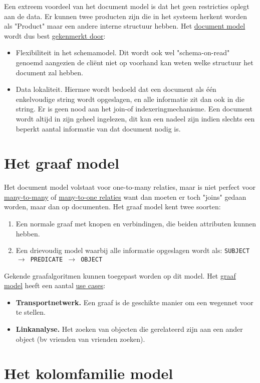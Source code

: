 \documentclass{report}
\begin{document}
	Een extreem voordeel van het document model is dat het geen restricties oplegt aan de data. Er kunnen twee producten zijn die in het systeem herkent worden als "Product" maar een andere interne structuur hebben. Het \underline{document model} wordt dus best \underline{gekenmerkt door}:
	\begin{itemize}
		\item Flexibiliteit in het schemamodel. Dit wordt ook wel "schema-on-read" genoemd aangezien de cliënt niet op voorhand kan weten welke structuur het document zal hebben.
		\item Data lokaliteit. Hiermee wordt bedoeld dat een document als één enkelvoudige string wordt opgeslagen, en alle informatie zit dan ook in die string. Er is geen nood aan het join-of indexeringmechanisme. Een document wordt altijd in zijn geheel ingelezen, dit kan een nadeel zijn indien slechts een beperkt aantal informatie van dat document nodig is.
	\end{itemize}

	\section{Het graaf model}
	Het document model volstaat voor one-to-many relaties, maar is niet perfect voor \underline{many-to-many} of \underline{many-to-one relaties} want dan moeten er toch "joins" gedaan worden, maar dan op documenten. Het graaf model kent twee soorten:
	\begin{enumerate}
		\item Een normale graaf met knopen en verbindingen, die beiden attributen kunnen hebben.
		\item Een drievoudig model waarbij alle informatie opgeslagen wordt als: \texttt{SUBJECT $\rightarrow$ PREDICATE $\rightarrow$ OBJECT}
	\end{enumerate}
	Gekende graafalgoritmen kunnen toegepast worden op dit model. Het \underline{graaf model} heeft een aantal \underline{use cases}:
	\begin{itemize}
		\item \textbf{Transportnetwerk.} Een graaf is de geschikte manier om een wegennet voor te stellen.
		\item \textbf{Linkanalyse.} Het zoeken van objecten die gerelateerd zijn aan een ander object (bv vrienden van vrienden zoeken).
	\end{itemize}

	\section{Het kolomfamilie model}
\end{document}
